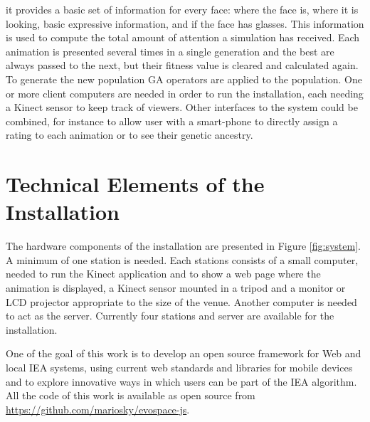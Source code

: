 \documentclass[letterpaper]{article}
\begin{document}
it provides a basic set of information for every face: where the face is, where it is looking, 
basic expressive information, and if the face has glasses. This information is used to compute 
the total amount of attention a simulation has received. Each animation is 
presented several times in a single generation and the best are always passed to the next, but
their fitness value is cleared and calculated again. To generate the new population GA operators
are applied to the population. One or more client computers are needed in order to run the 
installation, each needing a Kinect sensor to keep track of viewers. Other interfaces to
the system could be combined, for instance to allow user with a smart-phone to directly assign
a rating to each animation or to see their genetic ancestry.

\section{Technical Elements of the Installation}
The hardware components of the installation are presented in Figure \ref{fig:system}. A
minimum of one station is needed. Each stations consists of a small computer, needed 
to run the Kinect application and to show a web page where the animation is displayed, 
a Kinect sensor mounted in a tripod and a monitor or LCD projector appropriate to the
size of the venue. Another computer is needed to act as the server. Currently four stations
and server are available for the installation.  

One of the  goal of this work is to develop an open source framework for Web and local
IEA systems, using current web standards and libraries for mobile devices and to explore 
innovative ways in which users can be part of the IEA algorithm. All the code of this work
is available as open source from \url{https://github.com/mariosky/evospace-js}. 















\end{document}
